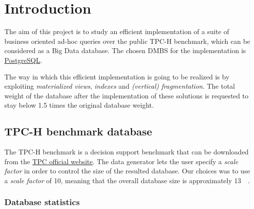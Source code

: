 

\section{Introduction}
\label{section:introduction}

The aim of this project is to study an efficient implementation of a suite of business oriented ad-hoc queries over the public TPC-H benchmark, which can be considered as a Big Data database. The chosen DMBS for the implementation is \href{https://www.postgresql.org}{PostgreSQL}.

The way in which this efficient implementation is going to be realized is by exploiting \textit{materialized views}, \textit{indexes} and \textit{(vertical) fragmentation}. The total weight of the database after the implementation of these solutions is requested to stay below \num{1.5} times the original database weight.

\subsection{TPC-H benchmark database}

The TPC-H benchmark is a decision support benchmark that can be downloaded from the \href{https://www.tpc.org/tpch/}{TPC official website}. The data generator lets the user specify a \textit{scale factor} in order to control the size of the resulted database. Our choices was to use a \textit{scale factor} of \num{10}, meaning that the overall database size is approximately \SI{13}{\giga\byte}.

\subsubsection{Database statistics}

